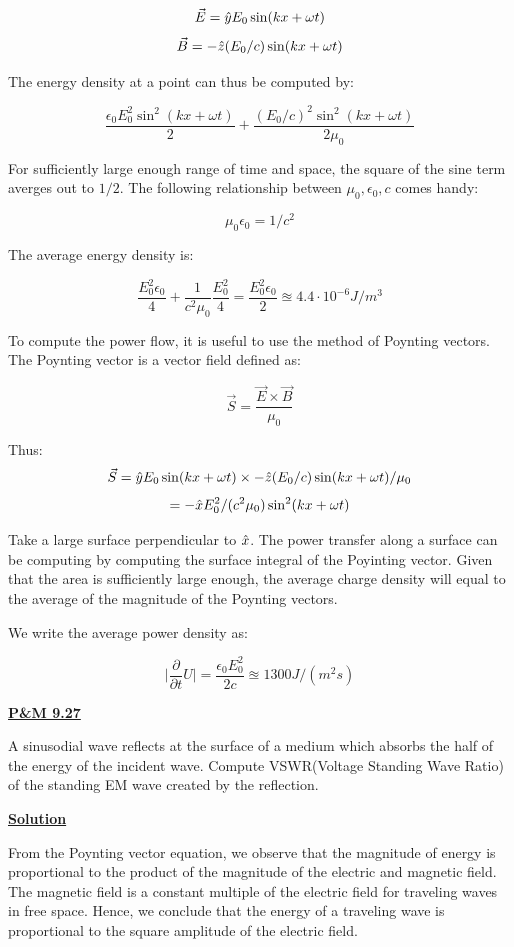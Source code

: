 \documentclass{article}
\newcommand{\new}[1]{
    \vspace{2mm}
    \noindent
    \textbf{
    \underline{#1}}
}
\newcommand{\parderiv}[1]{{
    \frac{\partial}{\partial{#1}}
}
}
\begin{document}
\[
    \vec{E} = \hat{y} E_0 \sin(kx + \omega t)
\]
\[
    \vec{B} = -\hat{z} (E_0/c) \sin(kx + \omega t)
\]

The energy density at a point can thus be computed by:

\[
    \frac{
\epsilon_0
E_0^2 \sin^2(kx + \omega t)
    }
    {2}
    + 
    \frac{ 
(E_0/c)^2 \sin^2(kx + \omega t)
    }
    {2\mu_0}
\]

For sufficiently large enough range of time and space, 
the square of the sine term averges out to $1/2$. 
The following relationship between $\mu_0, \epsilon_0, c$ 
comes handy:

\[
    \mu_0\epsilon_0 = 1/c^2
\]

The average energy density is:

\[
    \frac{E_0^2\epsilon_0}{4}
    +
    \frac{1}{c^2\mu_0}
    \frac{E_0^2}{4}
    =
    \boxed{
    \frac{E_0^2 \epsilon_0} {2}
    \approxeq 
    4.4 \cdot 10^{-6} J/m^3
    }
\]

To compute the power flow, it is useful to 
use the method of Poynting vectors. The 
Poynting vector is a vector field defined as:

\[
    \vec{S} = 
    \frac{\vec{E} \times \vec{B}}
    {\mu_0}
\]

Thus:
\[
    \vec{S} = \hat{y} E_0 \sin(kx + \omega t) \times 
    -\hat{z} (E_0/c) \sin(kx + \omega t)
    /\mu_0
\]
\[
    = -\hat{x} E_0^2/(c^2\mu_0) \sin^2(kx + \omega t)
\]

Take a large surface perpendicular to $\hat{x}$. 
The power transfer along a surface can be computing 
by computing the surface integral of the Poyinting 
vector. 
Given that the area is sufficiently large enough, 
the average charge density will equal to the average 
of the magnitude of the Poynting vectors. 

We write the average power density as:

\[
    \boxed{
    \bigg|\parderiv{t}U\bigg| = \frac{\epsilon_0 E_0^2}{2c}
\approxeq 1300 J/(m^2s)
    }
\]

\newpage

\new{P\&M 9.27}
A sinusodial wave reflects at the surface of a medium which 
absorbs the half of the energy of the incident wave. 
Compute VSWR(Voltage Standing Wave Ratio) of the standing 
EM wave created by the reflection. 

\new{Solution}
From the Poynting vector equation, we observe that the magnitude 
of energy is proportional to the product of the magnitude of 
the electric and magnetic field. The magnetic field is a constant 
multiple of the electric field for traveling waves in free space. 
Hence, we conclude that the energy of a traveling wave is proportional 
to the square amplitude of the electric field. 
\end{document}
